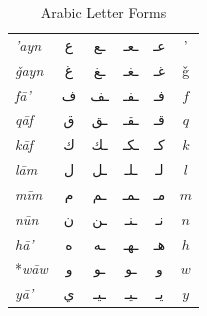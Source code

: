 \documentclass{article}
\newcommand{\ar}[1]{{\arabicfont #1}}
\begin{document}
\begin{table}[h]
\begin{tabular}{l c c c c c}
\textit{'ayn}             & \ar{ع}  & \ar{ـع}  & \ar{ـعـ}  & \ar{عـ}  & '           \\[4pt]
\textit{\v{g}ayn}         & \ar{غ}  & \ar{ـغ}  & \ar{ـغـ}  & \ar{غـ}  & \v{g}       \\[4pt]
\textit{f\={a}'}          & \ar{ف}  & \ar{ـف}  & \ar{ـفـ}  & \ar{فـ}  & $f$         \\[4pt]
\textit{q\={a}f}          & \ar{ق}  & \ar{ـق}  & \ar{ـقـ}  & \ar{قـ}  & $q$         \\[4pt]
\textit{k\={a}f}          & \ar{ك}  & \ar{ـك}  & \ar{ـكـ}  & \ar{كـ}  & $k$         \\[4pt]
\textit{l\={a}m}          & \ar{ل}  & \ar{ـل}  & \ar{ـلـ}  & \ar{لـ}  & $l$         \\[4pt]
\textit{m\={i}m}          & \ar{م}  & \ar{ـم}  & \ar{ـمـ}  & \ar{مـ}  & $m$         \\[4pt]
\textit{n\={u}n}          & \ar{ن}  & \ar{ـن}  & \ar{ـنـ}  & \ar{نـ}  & $n$         \\[4pt]
\textit{h\={a}'}          & \ar{ه}  & \ar{ـه}  & \ar{ـهـ}  & \ar{هـ}  & $h$         \\[4pt]
*\textit{w\={a}w}         & \ar{و}  & \ar{ـو}  & \ar{ـو}   & \ar{و}   & $w$         \\[4pt]
\textit{y\={a}'}          & \ar{ي}  & \ar{ـيـ} & \ar{ـيـ}  & \ar{يـ}  & $y$         \\[4pt]
\bottomrule
\end{tabular}
\caption{Arabic Letter Forms}
\end{table}
\end{document}
